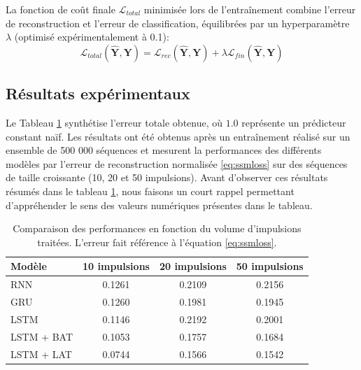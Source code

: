 La fonction de coût finale $\mathcal{L}_{total}$ minimisée lors de l'entraînement combine l'erreur de reconstruction et l'erreur de classification, équilibrées par un hyperparamètre $\lambda$ (optimisé expérimentalement à 0.1):
\begin{equation}
\label{eq:ssmloss}
\mathcal{L}_{total}(\hat{\mathbf{Y}}, \mathbf{Y}) = \mathcal{L}_{rec}(\hat{\mathbf{Y}}, \mathbf{Y}) + \lambda \mathcal{L}_{fin}(\hat{\mathbf{Y}}, \mathbf{Y})
\end{equation}

\subsection{Résultats expérimentaux}
Le Tableau \ref{tab:resRNN} synthétise l'erreur totale obtenue, où $1.0$ représente un prédicteur constant naïf. Les résultats ont été obtenus après un entraînement réalisé sur un ensemble de 500 000 séquences et mesurent la performances des différents modèles par l'erreur de reconstruction normalisée \eqref{eq:ssmloss} sur des séquences de taille croissante (10, 20 et 50 impulsions). Avant d'observer ces résultats résumés dans le tableau \ref{tab:resRNN}, nous faisons un court rappel permettant d'appréhender le sens des valeurs numériques présentes dans le tableau.\\

\begin{table}[htbp] 
\centering 
\begin{tabular}{l c c c} 
\toprule
\textbf{Modèle} & \textbf{10 impulsions} & \textbf{20 impulsions} & \textbf{50 impulsions} \\ 
\midrule
RNN & 0.1261 & 0.2109 & 0.2156 \\
GRU & 0.1260 & 0.1981 & 0.1945 \\ 
LSTM & 0.1146 & 0.2192 & 0.2001 \\ 
LSTM + BAT & 0.1053 & 0.1757 & 0.1684 \\ 
LSTM + LAT & 0.0744 & 0.1566 & 0.1542 \\ 
\bottomrule
\end{tabular} 
\caption{Comparaison des performances en fonction du volume d'impulsions traitées. L'erreur fait référence à l'équation \ref{eq:ssmloss}.} 
\label{tab:resRNN}
\end{table}

